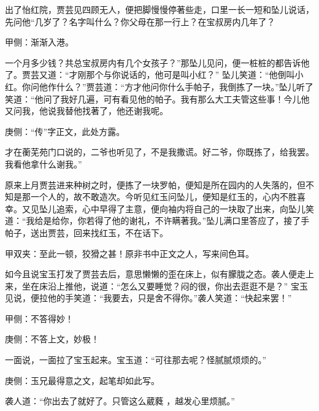 \begin{parag}
    出了怡红院，贾芸见四顾无人，便把脚慢慢停著些走，口里一长一短和坠儿说话，先问他“几岁了？名字叫什么？你父母在那一行上？在宝叔房内几年了？\begin{note}甲侧：渐渐入港。\end{note}一个月多少钱？共总宝叔房内有几个女孩子？”那坠儿见问，便一桩桩的都告诉他了。贾芸又道：“才刚那个与你说话的，他可是叫小红？” 坠儿笑道：“他倒叫小红。你问他作什么？”贾芸道：“方才他问你什么手帕子，我倒拣了一块。”坠儿听了笑道：“他问了我好几遍，可有看见他的帕子。我有那么大工夫管这些事！今儿他又问我，他说我替他找著了，他还谢我呢。\begin{note}庚侧：“传”字正文，此处方露。\end{note}才在蘅芜苑门口说的，二爷也听见了，不是我撒谎。好二爷，你既拣了，给我罢。我看他拿什么谢我。”
\end{parag}


\begin{parag}
    原来上月贾芸进来种树之时，便拣了一块罗帕，便知是所在园内的人失落的，但不知是那一个人的，故不敢造次。今听见红玉问坠儿，便知是红玉的，心内不胜喜幸。又见坠儿追索，心中早得了主意，便向袖内将自己的一块取了出来，向坠儿笑道：“我给是给你，你若得了他的谢礼，不许瞒著我。”坠儿满口里答应了，接了手帕子，送出贾芸，回来找红玉，不在话下。\begin{note}甲双夹：至此一顿，狡猾之甚！原非书中正文之人，写来间色耳。\end{note}
\end{parag}


\begin{parag}
    如今且说宝玉打发了贾芸去后，意思懒懒的歪在床上，似有朦胧之态。袭人便走上来，坐在床沿上推他，说道：“怎么又要睡觉？闷的很，你出去逛逛不是？” 宝玉见说，便拉他的手笑道：“我要去，只是舍不得你。”袭人笑道：“快起来罢！”\begin{note}甲侧：不答得妙！\end{note}\begin{note}庚侧：不答上文，妙极！\end{note}一面说，一面拉了宝玉起来。宝玉道：“可往那去呢？怪腻腻烦烦的。”\begin{note}庚侧：玉兄最得意之文，起笔却如此写。\end{note}袭人道：“你出去了就好了。只管这么葳蕤 ，越发心里烦腻。”
\end{parag}


